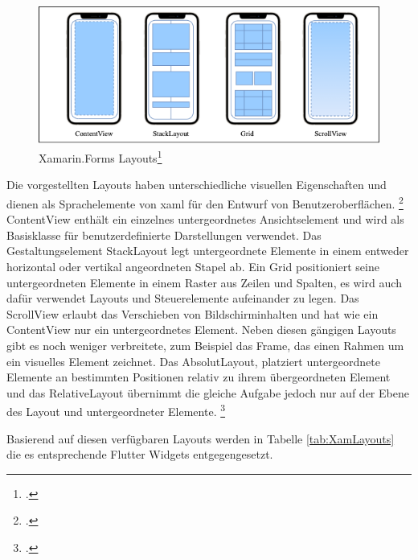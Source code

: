 \begin{figure}[!ht]
 \includegraphics[width=\textwidth,height=\textheight,keepaspectratio]{Images/CrossPlattformFrameworks/XamarinFormsLayouts.png}
 \caption[Xamarin.Forms Layouts]{Xamarin.Forms Layouts\footcite{MicrosoftXamViews2020}}
 \label{fig:Xamarin.Forms Layouts}
\end{figure}

Die vorgestellten Layouts haben  unterschiedliche visuellen Eigenschaften und dienen als Sprachelemente von \ac{xaml} für den Entwurf von Benutzeroberflächen.  \footcitetext[Abbildung in Anlehnung an][Abgerufen am \today]{MicrosoftXamLayouts2018} \glq ContentView\grq{} enthält ein einzelnes untergeordnetes Ansichtselement und wird als Basisklasse für benutzerdefinierte Darstellungen verwendet.  Das Gestaltungselement \glq StackLayout\grq{} legt untergeordnete Elemente in einem entweder horizontal oder vertikal angeordneten Stapel ab.  Ein \glq Grid\grq{} positioniert seine untergeordneten Elemente in einem Raster aus Zeilen und Spalten,  es wird auch dafür verwendet Layouts und Steuerelemente aufeinander zu legen.  Das \glq ScrollView\grq{} erlaubt das Verschieben von Bildschirminhalten und hat wie ein \glq ContentView\grq{} nur ein untergeordnetes Element.  
Neben diesen gängigen Layouts gibt es noch weniger verbreitete,  zum Beispiel  das \glq  Frame\grq{}, das einen Rahmen um ein visuelles Element zeichnet.  Das \glq AbsolutLayout\grq{},  platziert untergeordnete Elemente an bestimmten Positionen relativ zu ihrem übergeordneten Element und das \glq RelativeLayout\grq{} übernimmt die gleiche Aufgabe jedoch nur auf der Ebene des Layout und untergeordneter Elemente. \footcite[Vgl.][Abgerufen am \today]{MicrosoftXamLayouts2018}

Basierend auf diesen verfügbaren Layouts werden in Tabelle \ref{tab:XamLayouts}  die es entsprechende Flutter Widgets entgegengesetzt.  

